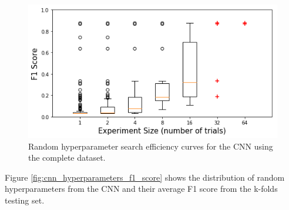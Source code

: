\begin{figure}[H]
	\centering
	\includegraphics[width=0.8\linewidth]{images/random_hp_search_cnn_full}
	\caption{Random hyperparameter search efficiency curves for the CNN using the complete dataset.}
	\label{fig:random_hp_search_cnn_full}
\end{figure}





Figure \ref{fig:cnn_hyperparameters_f1_score} shows the distribution of random hyperparameters from the CNN and their average F1 score from the k-folds testing set. 



